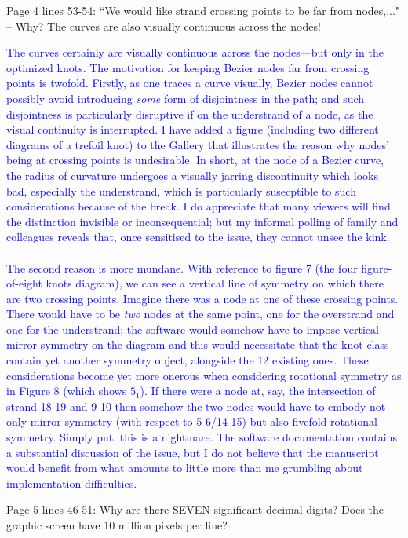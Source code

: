 \documentclass[12pt]{article}
\begin{document}
Page 4 lines 53-54: ``We would like strand crossing points to be far
from nodes,..."  -- Why?  The curves are also visually continuous across
the nodes!

\textcolor{blue}{The curves certainly are visually continuous across
  the nodes---but only in the optimized knots.  The motivation for
  keeping Bezier nodes far from crossing points is twofold.  Firstly,
  as one traces a curve visually, Bezier nodes cannot possibly avoid
  introducing {\em some} form of disjointness in the path; and such
  disjointness is particularly disruptive if on the understrand of a
  node, as the visual continuity is interrupted.  I have added a
  figure (including two different diagrams of a trefoil knot) to the
  Gallery that illustrates the reason why nodes' being at crossing
  points is undesirable.  In short, at the node of a Bezier curve, the
  radius of curvature undergoes a visually jarring discontinuity which
  looks bad, especially the understrand, which is particularly
  susecptible to such considerations because of the break.  I do
  appreciate that many viewers will find the distinction invisible or
  inconsequential; but my informal polling of family and colleagues
  reveals that, once sensitised to the issue, they cannot unsee the
  kink.  \\ \\ The second reason is more mundane.  With reference to
  figure 7 (the four figure-of-eight knots diagram), we can see a
  vertical line of symmetry on which there are two crossing points.
  Imagine there was a node at one of these crossing points.  There
  would have to be {\em two} nodes at the same point, one for the
  overstrand and one for the understrand; the software would somehow
  have to impose vertical mirror symmetry on the diagram and this
  would necessitate that the knot class contain yet another symmetry
  object, alongside the 12 existing ones.  These considerations become
  yet more onerous when considering rotational symmetry as in Figure 8
  (which shows $5_1$).  If there were a node at, say, the intersection
  of strand 18-19 and 9-10 then somehow the two nodes would have to
  embody not only mirror symmetry (with respect to 5-6/14-15) but also
  fivefold rotational symmetry.  Simply put, this is a nightmare.  The
  software documentation contains a substantial discussion of the
  issue, but I do not believe that the manuscript would benefit from
  what amounts to little more than me grumbling about implementation
  difficulties.}

Page 5 lines 46-51: Why are there SEVEN significant decimal digits?
Does the graphic screen have 10 million pixels per line?
\end{document}
